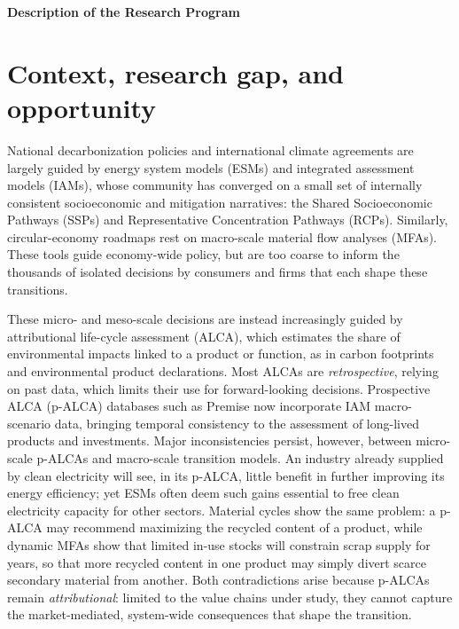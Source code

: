 \documentclass[compact]{nserc} %
\author{Guillaume Majeau-Bettez}
\begin{document}
\noindent \textbf{Description of the Research Program}

\section{Context, research gap, and opportunity}

National decarbonization policies and international climate agreements are largely guided by energy system models (ESMs) and integrated assessment models (IAMs), whose community has converged on a small set of internally consistent socioeconomic and mitigation narratives: the Shared Socioeconomic Pathways (SSPs) and Representative Concentration Pathways (RCPs). Similarly, circular-economy roadmaps rest on macro-scale material flow analyses (MFAs). These tools guide economy-wide policy, but are too coarse to inform the thousands of isolated decisions by consumers and firms that each shape these transitions.

These micro- and meso-scale decisions are instead increasingly guided by attributional life-cycle assessment (ALCA), which estimates the share of environmental impacts linked to a product or function, as in carbon footprints and environmental product declarations. Most ALCAs are \emph{retrospective}, relying on past data, which limits their use for forward-looking decisions. Prospective ALCA (p-ALCA) databases such as Premise now incorporate IAM macro-scenario data, bringing temporal consistency to the assessment of long-lived products and investments. Major inconsistencies persist, however, between micro-scale p-ALCAs and macro-scale transition models. An industry already supplied by clean electricity will see, in its p-ALCA, little benefit in further improving its energy efficiency; yet ESMs often deem such gains essential to free clean electricity capacity for other sectors. Material cycles show the same problem: a p-ALCA may recommend maximizing the recycled content of a product, while dynamic MFAs show that limited in-use stocks will constrain scrap supply for years, so that more recycled content in one product may simply divert scarce secondary material from another. Both contradictions arise because p-ALCAs remain \emph{attributional}: limited to the value chains under study, they cannot capture the market-mediated, system-wide consequences that shape the transition.
\end{document}
